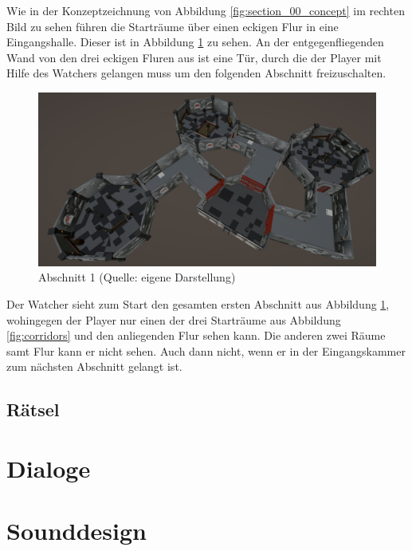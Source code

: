 Wie in der Konzeptzeichnung von Abbildung \ref{fig:section_00_concept} im rechten Bild zu sehen führen die Starträume über einen eckigen Flur in eine Eingangshalle. Dieser ist in Abbildung \ref{fig:section_00} zu sehen. An der entgegenfliegenden Wand von den drei eckigen Fluren aus ist eine Tür, durch die der Player mit Hilfe des Watchers gelangen muss um den folgenden Abschnitt freizuschalten. 

\begin{figure}[ht]
\centering
\includegraphics[width=1\linewidth]{content/pictures/Abschnitt_00.PNG}
\caption{Abschnitt 1 (Quelle: eigene Darstellung)}
\label{fig:section_00}
\end{figure}

Der Watcher sieht zum Start den gesamten ersten Abschnitt aus Abbildung \ref{fig:section_00}, wohingegen der Player nur einen der drei Starträume aus Abbildung \ref{fig:corridors} und den anliegenden Flur sehen kann. Die anderen zwei Räume samt Flur kann er nicht sehen. Auch dann nicht, wenn er in der Eingangskammer zum nächsten Abschnitt gelangt ist.



\subsection{Rätsel}

\section{Dialoge}

\section{Sounddesign}



